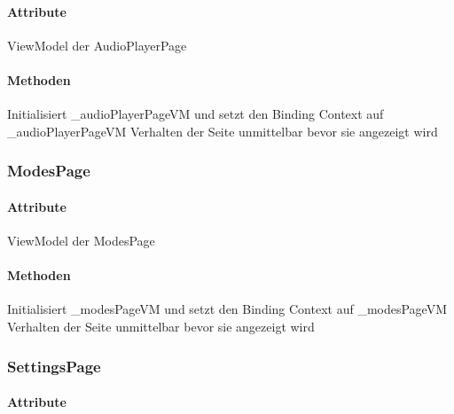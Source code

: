 \documentclass[../entwurf.tex]{subfiles}
\begin{document}
\paragraph{Attribute}
\begin{itemize}
	 ViewModel der AudioPlayerPage
\end{itemize}

\paragraph{Methoden}

\begin{itemize}
	 Initialisiert \_audioPlayerPageVM und setzt den Binding Context 			auf \_audioPlayerPageVM
	 Verhalten der Seite unmittelbar bevor sie angezeigt wird
\end{itemize}

\subsubsection{ModesPage}

\paragraph{Attribute}
\begin{itemize}
	 ViewModel der ModesPage
\end{itemize}

\paragraph{Methoden}

\begin{itemize}
	 Initialisiert \_modesPageVM und setzt den Binding Context 			auf \_modesPageVM
	 Verhalten der Seite unmittelbar bevor sie angezeigt wird
\end{itemize}

\subsubsection{SettingsPage}
\paragraph{Attribute}
\end{document}
